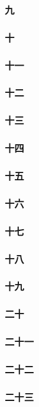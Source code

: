 \subsubsection*{九}
\subsubsection*{十}
\subsubsection*{十一}
\subsubsection*{十二}
\subsubsection*{十三}
\subsubsection*{十四}
\subsubsection*{十五}
\subsubsection*{十六}
\subsubsection*{十七}
\subsubsection*{十八}
\subsubsection*{十九}
\subsubsection*{二十}
\subsubsection*{二十一}
\subsubsection*{二十二}
\subsubsection*{二十三}







